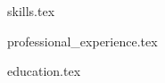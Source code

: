 \documentclass{resume} %
\begin{document}
\vspace{-0.5em}

{skills.tex}

{professional_experience.tex}

{education.tex}

\end{document}
